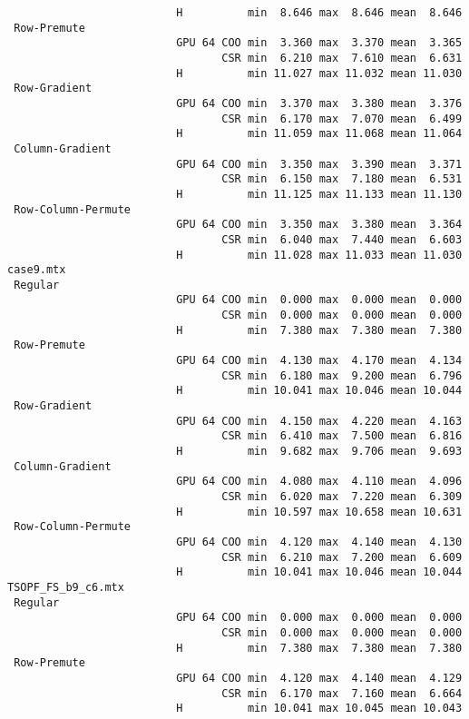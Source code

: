 {\begin{verbatim}
                          H          min  8.646 max  8.646 mean  8.646
 Row-Premute
                          GPU 64 COO min  3.360 max  3.370 mean  3.365
                                 CSR min  6.210 max  7.610 mean  6.631
                          H          min 11.027 max 11.032 mean 11.030
 Row-Gradient
                          GPU 64 COO min  3.370 max  3.380 mean  3.376
                                 CSR min  6.170 max  7.070 mean  6.499
                          H          min 11.059 max 11.068 mean 11.064
 Column-Gradient
                          GPU 64 COO min  3.350 max  3.390 mean  3.371
                                 CSR min  6.150 max  7.180 mean  6.531
                          H          min 11.125 max 11.133 mean 11.130
 Row-Column-Permute
                          GPU 64 COO min  3.350 max  3.380 mean  3.364
                                 CSR min  6.040 max  7.440 mean  6.603
                          H          min 11.028 max 11.033 mean 11.030
case9.mtx
 Regular
                          GPU 64 COO min  0.000 max  0.000 mean  0.000
                                 CSR min  0.000 max  0.000 mean  0.000
                          H          min  7.380 max  7.380 mean  7.380
 Row-Premute
                          GPU 64 COO min  4.130 max  4.170 mean  4.134
                                 CSR min  6.180 max  9.200 mean  6.796
                          H          min 10.041 max 10.046 mean 10.044
 Row-Gradient
                          GPU 64 COO min  4.150 max  4.220 mean  4.163
                                 CSR min  6.410 max  7.500 mean  6.816
                          H          min  9.682 max  9.706 mean  9.693
 Column-Gradient
                          GPU 64 COO min  4.080 max  4.110 mean  4.096
                                 CSR min  6.020 max  7.220 mean  6.309
                          H          min 10.597 max 10.658 mean 10.631
 Row-Column-Permute
                          GPU 64 COO min  4.120 max  4.140 mean  4.130
                                 CSR min  6.210 max  7.200 mean  6.609
                          H          min 10.041 max 10.046 mean 10.044
TSOPF_FS_b9_c6.mtx
 Regular
                          GPU 64 COO min  0.000 max  0.000 mean  0.000
                                 CSR min  0.000 max  0.000 mean  0.000
                          H          min  7.380 max  7.380 mean  7.380
 Row-Premute
                          GPU 64 COO min  4.120 max  4.140 mean  4.129
                                 CSR min  6.170 max  7.160 mean  6.664
                          H          min 10.041 max 10.045 mean 10.043

\end{verbatim}}
